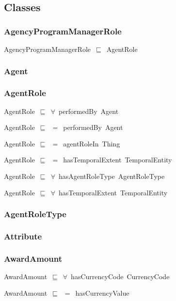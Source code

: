 \documentclass{article}
\begin{document}
\subsection*{Classes}

\subsubsection*{AgencyProgramManagerRole}

AgencyProgramManagerRole~\ensuremath{\sqsubseteq}~AgentRole~

\subsubsection*{Agent}

\subsubsection*{AgentRole}

AgentRole~\ensuremath{\sqsubseteq}~\ensuremath{\forall}~performedBy~Agent~

AgentRole~\ensuremath{\sqsubseteq}~\ensuremath{=}~performedBy~Agent~

AgentRole~\ensuremath{\sqsubseteq}~\ensuremath{=}~agentRoleIn~Thing~

AgentRole~\ensuremath{\sqsubseteq}~\ensuremath{=}~hasTemporalExtent~TemporalEntity~

AgentRole~\ensuremath{\sqsubseteq}~\ensuremath{\forall}~hasAgentRoleType~AgentRoleType~

AgentRole~\ensuremath{\sqsubseteq}~\ensuremath{\forall}~hasTemporalExtent~TemporalEntity~

\subsubsection*{AgentRoleType}

\subsubsection*{Attribute}

\subsubsection*{AwardAmount}

AwardAmount~\ensuremath{\sqsubseteq}~\ensuremath{\forall}~hasCurrencyCode~CurrencyCode~

AwardAmount~\ensuremath{\sqsubseteq}~\ensuremath{=}~hasCurrencyValue~
\end{document}
